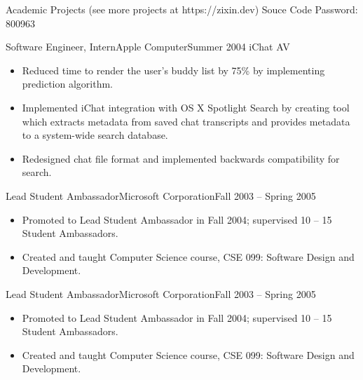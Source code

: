 \documentclass[]{mcdowellcv}
\begin{document}
	\begin{cvsection}{Academic Projects (see more projects at https://zixin.dev) Souce Code Password: 800963}
		\begin{cvsubsection}{Software Engineer, Intern}{Apple Computer}{Summer 2004}
			iChat AV			
			\begin{itemize}
				\item Reduced time to render the user’s buddy list by 75\% by implementing prediction algorithm.
				\item Implemented iChat integration with OS X Spotlight Search by creating tool which extracts metadata from saved chat transcripts and provides metadata to a system-wide search database.
				\item Redesigned chat file format and implemented backwards compatibility for search.
			\end{itemize}
		\end{cvsubsection}
		
		\begin{cvsubsection}{Lead Student Ambassador}{Microsoft Corporation}{Fall 2003 -- Spring 2005}	
			\begin{itemize}
				\item Promoted to Lead Student Ambassador in Fall 2004; supervised 10 -- 15 Student Ambassadors.
				\item Created and taught Computer Science course, CSE 099: Software Design and Development.
			\end{itemize}
		\end{cvsubsection}

		\begin{cvsubsection}{Lead Student Ambassador}{Microsoft Corporation}{Fall 2003 -- Spring 2005}	
			\begin{itemize}
				\item Promoted to Lead Student Ambassador in Fall 2004; supervised 10 -- 15 Student Ambassadors.
				\item Created and taught Computer Science course, CSE 099: Software Design and Development.
			\end{itemize}
		\end{cvsubsection}
	\end{cvsection}
	
\end{document}
